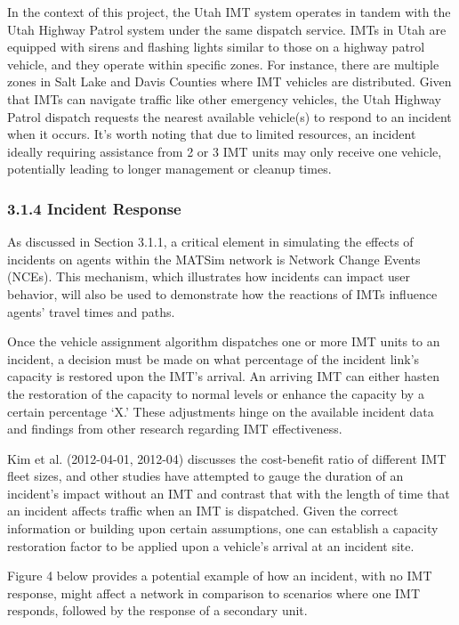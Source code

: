 \documentclass[
  letterpaper,
  DIV=11,
  numbers=noendperiod]{scrreprt}
\begin{document}
In the context of this project, the Utah IMT system operates in tandem
with the Utah Highway Patrol system under the same dispatch service.
IMTs in Utah are equipped with sirens and flashing lights similar to
those on a highway patrol vehicle, and they operate within specific
zones. For instance, there are multiple zones in Salt Lake and Davis
Counties where IMT vehicles are distributed. Given that IMTs can
navigate traffic like other emergency vehicles, the Utah Highway Patrol
dispatch requests the nearest available vehicle(s) to respond to an
incident when it occurs. It's worth noting that due to limited
resources, an incident ideally requiring assistance from 2 or 3 IMT
units may only receive one vehicle, potentially leading to longer
management or cleanup times.

\hypertarget{incident-response}{%
\subsubsection{3.1.4 Incident Response}\label{incident-response}}

As discussed in Section 3.1.1, a critical element in simulating the
effects of incidents on agents within the MATSim network is Network
Change Events (NCEs). This mechanism, which illustrates how incidents
can impact user behavior, will also be used to demonstrate how the
reactions of IMTs influence agents' travel times and paths.

Once the vehicle assignment algorithm dispatches one or more IMT units
to an incident, a decision must be made on what percentage of the
incident link's capacity is restored upon the IMT's arrival. An arriving
IMT can either hasten the restoration of the capacity to normal levels
or enhance the capacity by a certain percentage `X.' These adjustments
hinge on the available incident data and findings from other research
regarding IMT effectiveness.

Kim et al. (2012-04-01, 2012-04) discusses the cost-benefit ratio of
different IMT fleet sizes, and other studies have attempted to gauge the
duration of an incident's impact without an IMT and contrast that with
the length of time that an incident affects traffic when an IMT is
dispatched. Given the correct information or building upon certain
assumptions, one can establish a capacity restoration factor to be
applied upon a vehicle's arrival at an incident site.

Figure 4 below provides a potential example of how an incident, with no
IMT response, might affect a network in comparison to scenarios where
one IMT responds, followed by the response of a secondary unit.
\end{document}
